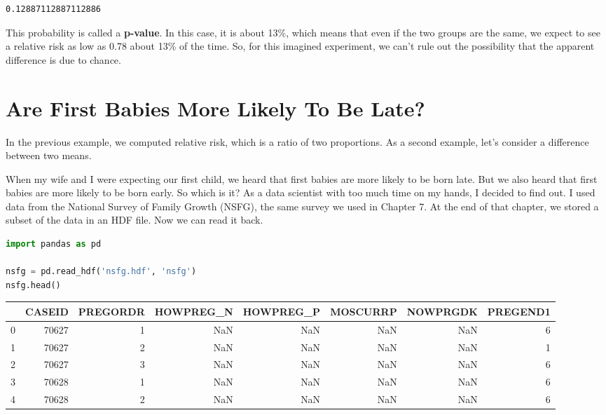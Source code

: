 \begin{lstlisting}[style=output]
0.12887112887112886
\end{lstlisting}

This probability is called a \textbf{p-value}. In this case, it is about
13\%, which means that even if the two groups are the same, we expect to
see a relative risk as low as 0.78 about 13\% of the time. So, for this
imagined experiment, we can't rule out the possibility that the apparent
difference is due to chance.

\pagebreak

\section{Are First Babies More Likely To Be
Late?}\label{are-first-babies-more-likely-to-be-late}

In the previous example, we computed relative risk, which is a ratio of
two proportions. As a second example, let's consider a difference
between two means.

When my wife and I were expecting our first child, we heard that first
babies are more likely to be born late. But we also heard that first
babies are more likely to be born early. So which is it? As a data
scientist with too much time on my hands, I decided to find out. I used
data from the National Survey of Family Growth (NSFG), the same survey
we used in Chapter 7. At the end of that chapter, we stored a subset of
the data in an HDF file. Now we can read it back.

\begin{lstlisting}[language=Python,style=source]
import pandas as pd

nsfg = pd.read_hdf('nsfg.hdf', 'nsfg')
nsfg.head()
\end{lstlisting}



\begin{tabular}{lrrrrrrr}
\toprule
 & CASEID & PREGORDR & HOWPREG\_N & HOWPREG\_P & MOSCURRP & NOWPRGDK & PREGEND1 \\
\midrule
0 & 70627 & 1 & NaN & NaN & NaN & NaN & 6 \\
1 & 70627 & 2 & NaN & NaN & NaN & NaN & 1 \\
2 & 70627 & 3 & NaN & NaN & NaN & NaN & 6 \\
3 & 70628 & 1 & NaN & NaN & NaN & NaN & 6 \\
4 & 70628 & 2 & NaN & NaN & NaN & NaN & 6 \\
\bottomrule
\end{tabular}


